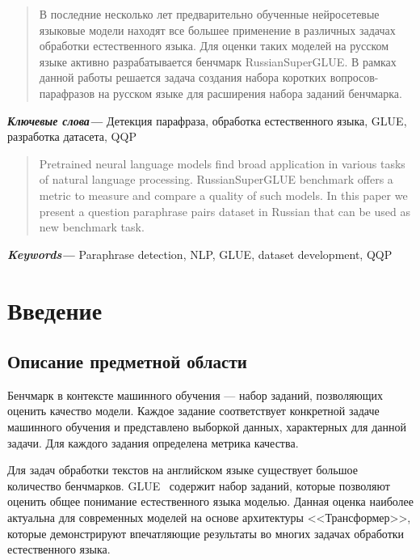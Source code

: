 \documentclass[a4paper,14pt]{extarticle}
\begin{document}
\newpage

{
	\hypersetup{linkcolor=black}
	\tableofcontents
}

\newpage
{}
\begin{abstract}
    В последние несколько лет предварительно обученные нейросетевые языковые модели находят все большее применение в различных задачах обработки естественного языка.
    Для оценки таких моделей на русском языке активно разрабатывается бенчмарк RussianSuperGLUE.
    В рамках данной работы решается задача создания набора коротких вопросов-парафразов на русском языке для расширения набора заданий бенчмарка.
\end{abstract}
\textbf{\textit{Ключевые слова---}} Детекция парафраза, обработка естественного языка, GLUE, разработка датасета, QQP

\begin{abstract}
    Pretrained neural language models find broad application in various tasks of natural language processing.
    RussianSuperGLUE benchmark offers a metric to measure and compare a quality of such models.
    In this paper we present a question paraphrase pairs dataset in Russian that can be used as new benchmark task.
\end{abstract}
\textbf{\textit{Keywords---}} Paraphrase detection, NLP, GLUE, dataset development, QQP


\newpage

\section{Введение}
\subsection{Описание предметной области}

Бенчмарк в контексте машинного обучения — набор заданий, позволяющих оценить качество модели. Каждое задание соответствует конкретной задаче машинного обучения и представлено выборкой данных, характерных для данной задачи. Для каждого задания определена метрика качества.

Для задач обработки текстов на английском языке существует большое количество бенчмарков.
GLUE~\autocite{wang2018glue} содержит набор заданий, которые позволяют оценить общее понимание естественного языка моделью. Данная оценка наиболее актуальна для современных моделей на основе архитектуры <<Трансформер>>, которые демонстрируют впечатляющие результаты во многих задачах обработки естественного языка.
\end{document}

